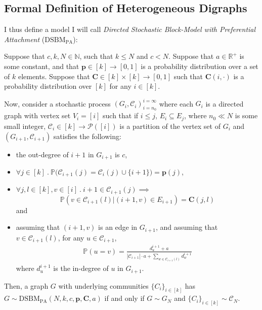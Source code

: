 \subsection{Formal Definition of Heterogeneous Digraphs}
I thus define a model I will call
\emph{Directed Stochastic Block-Model with Preferential Attachment} ($\mathrm{DSBM}_\mathrm{PA}$):
\begin{definition}
\label{def:DSBMPA}
	Suppose that $c,k,N \in \mathbb{N}$, such that $k \leq N$ and $c < N$. 
	Suppose that $a \in \mathbb{R}^+$ is some constant, and that $\mathbf{p} \in [k]\rightarrow 
	[0,1]$ is a probability distribution over a set of $k$ elements. Suppose that $\mathbf{C} 
	\in [k] \times [k] \rightarrow [0,1]$ such that $\mathbf{C}(i, \cdot)$ is a probability 
	distribution over $[k]$ for any $i \in [k]$. 

	Now, consider a stochastic process $(G_i, \mathcal{C}_i)_{i = n_0}^{i=\infty}$ where 
	each $G_i$ is a directed graph with vertex set $V_i = [i]$ such that if $i \leq j$,
	$E_i \subseteq E_j$, where $n_0 \ll N$ is some small integer, $\mathcal{C}_i \in [k] 
	\rightarrow \mathcal{P}([i])$ is a partition of the vertex set of $G_i$ and $(G_{i+1}, 
	\mathcal{C}_{i+1})$ satisfies the following:
	\begin{itemize}
		\item
		the out-degree of $i+1$ in $G_{i+1}$ is $c$,
		\item
		$\forall j \in [k]\ .\ \mathbb{P}\big(\mathcal{C}_{i+1}(j) = \mathcal{C}_i(j)  
		\cup\{i+1\} \big) = \mathbf{p}(j)$,
		\item
		$\forall j,l \in [k], v \in [i]\ .\ i+1 \in \mathcal{C}_{i+1}(j) \implies $
		$$
			\mathbb{P}\left(v \in \mathcal{C}_{i+1}(l)\big|(i+1, v)\in E_{i+1}\right) 
			= \mathbf{C}(j, l)
		$$
		and
		\item
		assuming that $(i+1, v)$ is an edge in $G_{i+1}$, and assuming that $v \in 
		\mathcal{C}_{i+1}(l)$, for any $u \in \mathcal{C}_{i+1}$, 
		\begin{align}
			\mathbb{P}(u = v) = \frac{d_u^{i+1} + a}{|\mathcal{C}_{i+1}|\cdot a + 
			\sum_{w \in \mathcal{C}_{i+1}(l)} d_w^{i+1}} \label{equ:probpickedfromclust}
		\end{align} 
		where $d_u^{i+1}$ is the in-degree of $u$ in $G_{i+1}$.
	\end{itemize}

	Then, a graph $G$ with underlying communities $\{C_i\}_{i \in [k]}$ has $G \sim 
	\mathrm{DSBM}_\mathrm{PA}(N, k, c, \mathbf{p}, \mathbf{C}, a)$ if and only if $G \sim G_N$
	and $\{C_i\}_{i \in [k]} \sim \mathcal{C}_N$.
\end{definition}

